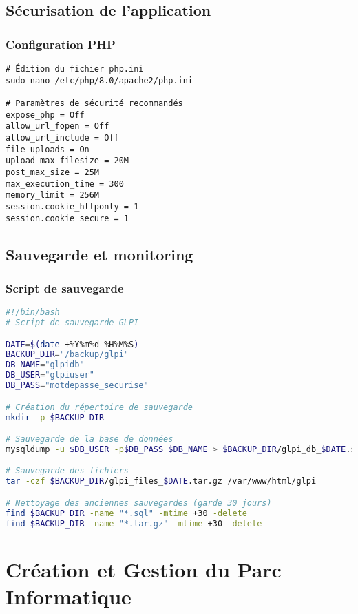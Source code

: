 \documentclass[12pt,a4paper]{article}
\begin{document}
\subsection{Sécurisation de l'application}

\subsubsection{Configuration PHP}
\begin{lstlisting}[caption=Modifications dans php.ini]
# Édition du fichier php.ini
sudo nano /etc/php/8.0/apache2/php.ini

# Paramètres de sécurité recommandés
expose_php = Off
allow_url_fopen = Off
allow_url_include = Off
file_uploads = On
upload_max_filesize = 20M
post_max_size = 25M
max_execution_time = 300
memory_limit = 256M
session.cookie_httponly = 1
session.cookie_secure = 1
\end{lstlisting}

\subsection{Sauvegarde et monitoring}

\subsubsection{Script de sauvegarde}
\begin{lstlisting}[language=bash, caption=Script de sauvegarde automatique]
#!/bin/bash
# Script de sauvegarde GLPI

DATE=$(date +%Y%m%d_%H%M%S)
BACKUP_DIR="/backup/glpi"
DB_NAME="glpidb"
DB_USER="glpiuser"
DB_PASS="motdepasse_securise"

# Création du répertoire de sauvegarde
mkdir -p $BACKUP_DIR

# Sauvegarde de la base de données
mysqldump -u $DB_USER -p$DB_PASS $DB_NAME > $BACKUP_DIR/glpi_db_$DATE.sql

# Sauvegarde des fichiers
tar -czf $BACKUP_DIR/glpi_files_$DATE.tar.gz /var/www/html/glpi

# Nettoyage des anciennes sauvegardes (garde 30 jours)
find $BACKUP_DIR -name "*.sql" -mtime +30 -delete
find $BACKUP_DIR -name "*.tar.gz" -mtime +30 -delete
\end{lstlisting}

\section{Création et Gestion du Parc Informatique}
\end{document}
